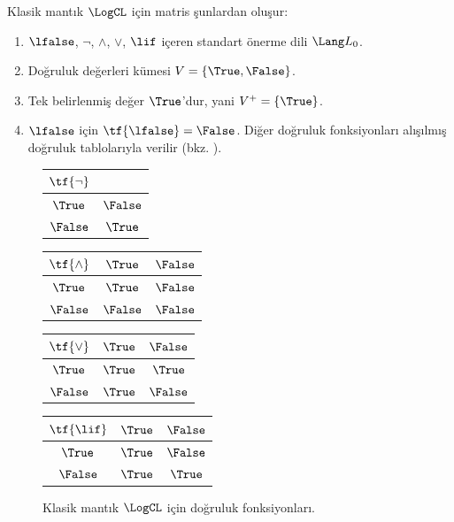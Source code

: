 \documentclass[../../../include/open-logic-section]{subfiles}
\begin{document}
\begin{ex}
Klasik mantık $\LogCL$ için matris şunlardan oluşur:
\begin{enumerate}
  \item $\lfalse$, $\lnot$, $\land$, $\lor$, $\lif$ içeren standart
  önerme dili $\Lang L_0$.
  \item Doğruluk değerleri kümesi $V=\{\True,\False\}$.
  \item Tek belirlenmiş değer $\True$'dur, yani $V^+=\{\True\}$.
  \item $\lfalse$ için $\tf{\lfalse}=\False$. Diğer doğruluk fonksiyonları
  alışılmış doğruluk tablolarıyla verilir (bkz. ).
\end{enumerate}
\begin{figure}
  \begin{center}
      \begin{tabular}{c|c} 
        $\tf{\lnot}$ & \\ 
        \hline  
        $\True$ & $\False$ \\ 
        $\False$ & $\True$ 
      \end{tabular}
      \quad
      \begin{tabular}{c|cc} 
        $\tf{\land}$ & $\True$ & $\False$ \\ 
        \hline 
        $\True$ & $\True$ & $\False$ \\ 
        $\False$ & $\False$ & $\False$ 
      \end{tabular}
      \quad
      \begin{tabular}{c|cc} 
        $\tf{\lor}$ & $\True$ & $\False$ \\ 
        \hline 
        $\True$ & $\True$ & $\True$ \\ 
        $\False$ & $\True$ & $\False$ 
      \end{tabular}
      \quad
      \begin{tabular}{c|cc} 
        $\tf{\lif}$ & $\True$ & $\False$ \\ 
        \hline 
        $\True$ & $\True$ & $\False$ \\ 
        $\False$ & $\True$ & $\True$ 
      \end{tabular}
    \end{center} 
    \caption{Klasik mantık $\LogCL$ için doğruluk fonksiyonları.}
  \end{figure}
  \end{ex}
\end{document}
